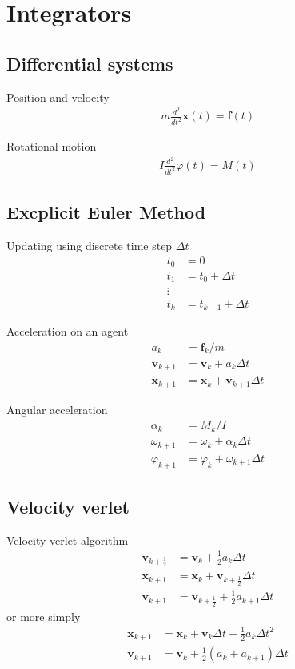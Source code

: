 \section{Integrators}
\subsection{Differential systems}
Position and velocity
\begin{align}
m \frac{d^{2}}{d t^{2}} \mathbf{x}(t) = \mathbf{f}(t)
\end{align}

Rotational motion
\begin{align}
I \frac{d^{2}}{d t^{2}} \varphi(t) = M(t)
\end{align}


\subsection{Excplicit Euler Method}
Updating using discrete time step $ \Delta t $
\begin{align}
t_{0} &= 0 \\
t_{1} &= t_{0} + \Delta t \\
\vdots \\
t_{k} &= t_{k-1} + \Delta t
\end{align}


Acceleration on an agent
\begin{align}
a_{k} &= \mathbf{f}_{k} / m \\
\mathbf{v}_{k+1} &= \mathbf{v}_{k} + a_{k} \Delta t \\
\mathbf{x}_{k+1} &= \mathbf{x}_{k} + \mathbf{v}_{k+1} \Delta t
\end{align}


Angular acceleration
\begin{align}
\alpha_{k} &= M_{k} / I \\
\omega_{k+1} &= \omega_{k} + \alpha_{k} \Delta t \\
\varphi_{k+1} &= \varphi_{k} + \omega_{k+1} \Delta t
\end{align}



\subsection{Velocity verlet}
Velocity verlet algorithm
\begin{align}
\mathbf{v}_{k+\frac{1}{2}} &= \mathbf{v}_{k} + \frac{1}{2} a_{k} \Delta t \\
\mathbf{x}_{k+1} &= \mathbf{x}_{k} + \mathbf{v}_{k+\frac{1}{2}} \Delta t \\
\mathbf{v}_{k+1} &= \mathbf{v}_{k+\frac{1}{2}} + \frac{1}{2} a_{k+1} \Delta t
\end{align}
or more simply
\begin{align}
\mathbf{x}_{k+1} &= \mathbf{x}_{k} + \mathbf{v}_{k} \Delta t + \frac{1}{2} a_{k} \Delta t^{2} \\
\mathbf{v}_{k+1} &= \mathbf{v}_{k} + \frac{1}{2} \left(a_{k} + a_{k+1}\right) \Delta t \\
\end{align}
